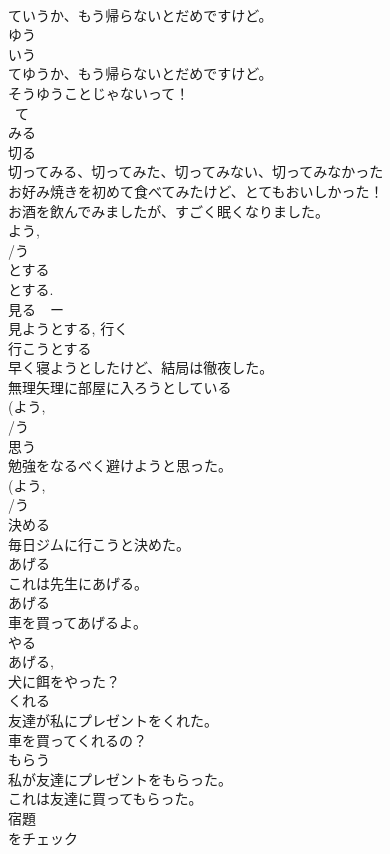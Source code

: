 \documentclass[8pt]{extreport}
\begin{document}
\begin{CJK}{UTF8}{min}
\\	ていうか、もう帰らないとだめですけど。
\\	ゆう	
\\	いう 
\\	てゆうか、もう帰らないとだめですけど。 
\\	そうゆうことじゃないって！ 
\\	~て 
\\	みる	
\\	切る 
\\	切ってみる、切ってみた、切ってみない、切ってみなかった 
\\	お好み焼きを初めて食べてみたけど、とてもおいしかった！ 
\\	お酒を飲んでみましたが、すごく眠くなりました。
\\	よう, 
\\	/う 
\\	とする	
\\	とする. 
\\	見る　ー
\\	見ようとする, 行く 
\\	行こうとする 
\\	早く寝ようとしたけど、結局は徹夜した。
\\	無理矢理に部屋に入ろうとしている
\\	(よう, 
\\	/う 
\\	思う	
\\	勉強をなるべく避けようと思った。
\\	(よう, 
\\	/う 
\\	決める	
\\	毎日ジムに行こうと決めた。
\\	あげる	
\\	これは先生にあげる。 
\\	あげる	
\\	車を買ってあげるよ。
\\	やる	
\\	あげる, 
\\	犬に餌をやった？ 
\\	くれる	
\\	友達が私にプレゼントをくれた。 
\\	車を買ってくれるの？ 
\\	もらう	
\\	私が友達にプレゼントをもらった。
\\	これは友達に買ってもらった。
\\	宿題
\\	をチェック

\end{CJK}
\end{document}

